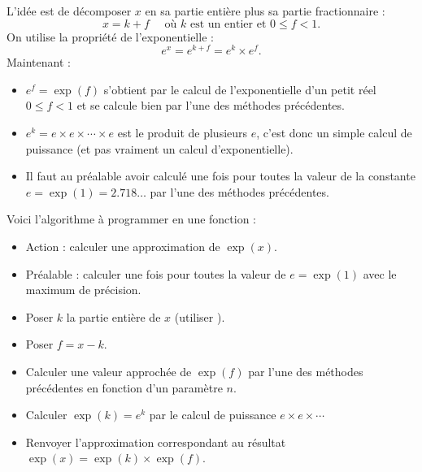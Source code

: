 \documentclass[11pt,class=report,crop=false]{standalone}
\begin{document}
\begin{activite}
\begin{enumerate}
  L'idée est de décomposer $x$ en sa partie entière plus sa partie fractionnaire :
  $$x = k + f \quad \text{ où $k$ est un entier et $0 \le f < 1.$}$$
  On utilise la propriété de l'exponentielle :
  $$e^x = e^{k+f} = e^k \times e^f.$$
  Maintenant :
  \begin{itemize}
    \item $e^f = \exp(f)$ s'obtient par le calcul de l'exponentielle d'un petit réel $0\le f < 1$ et se calcule bien par l'une des méthodes précédentes. 
    \item $e^k = e \times e \times \cdots \times e$ est le produit de plusieurs
    $e$, c'est donc un simple calcul de puissance (et pas vraiment un calcul d'exponentielle). 
    \item Il faut au préalable avoir calculé une fois pour toutes la valeur de la constante $e = \exp(1) = 2.718\ldots$ par l'une des méthodes précédentes.
  \end{itemize}
  
  Voici l'algorithme à programmer en une fonction  :
    \begin{algorithme}
  \sauteligne 
 \begin{itemize}
   \item Action : calculer une approximation de $\exp(x)$.
  
  \item Préalable : calculer une fois pour toutes la valeur de $e=\exp(1)$ avec le maximum de précision.
     
  \item Poser $k$ la partie entière de $x$ (utiliser ).

  \item Poser $f = x-k$.
  
  \item Calculer une valeur approchée de $\exp(f)$ par l'une des méthodes précédentes en fonction d'un paramètre $n$.
  
  \item Calculer $\exp(k)=e^k$ par le calcul de puissance $e\times e \times \cdots$
  \item Renvoyer l'approximation correspondant au résultat $\exp(x) = \exp(k)\times \exp(f)$. 
  
 \end{itemize}  
 \end{algorithme}    
\end{enumerate}   
\end{activite}


%
%
%
%
%
%
%
\end{document}
